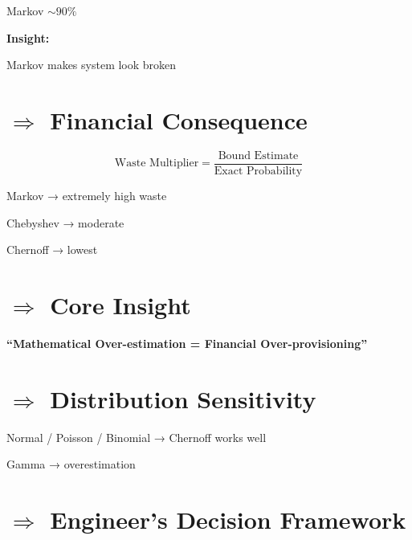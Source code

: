 \documentclass{article}
\begin{document}
Markov $\sim 90\%$  

\vspace{0.2cm}

\textbf{Insight:}

Markov makes system look broken  

\vspace{0.6cm}


\section*{$\Rightarrow$ Financial Consequence}

\[
\text{Waste Multiplier} =
\frac{\text{Bound Estimate}}{\text{Exact Probability}}
\]

\vspace{0.2cm}

Markov → extremely high waste  

Chebyshev → moderate  

Chernoff → lowest  

\vspace{0.6cm}


\section*{$\Rightarrow$ Core Insight}

\begin{center}
\textbf{``Mathematical Over-estimation = Financial Over-provisioning''}
\end{center}

\vspace{0.6cm}


\section*{$\Rightarrow$ Distribution Sensitivity}

Normal / Poisson / Binomial → Chernoff works well  

Gamma → overestimation  

\vspace{0.6cm}


\section*{$\Rightarrow$ Engineer’s Decision Framework}
\end{document}
